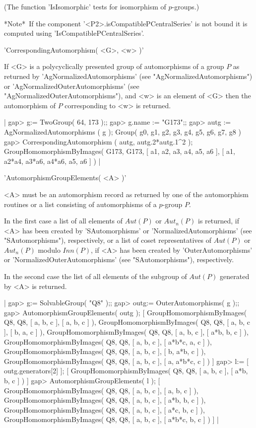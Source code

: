 (The function 'IsIsomorphic' tests for isomorphism of $p$-groups.)

*Note*\:\ If the component '<P2>.isCompatiblePCentralSeries' is not bound
it is computed using 'IsCompatiblePCentralSeries'.


'CorrespondingAutomorphism( <G>, <w> )'

If <G> is a polycyclically presented group of automorphisms of a group $P$
as returned by 'AgNormalizedAutomorphisms' (see
"AgNormalizedAutomorphisms") or
'AgNormalizedOuterAutomorphisms' (see "AgNormalizedOuterAutomorphisms"),
and <w> is an element of <G> then the automorphism of $P$ corresponding to
<w> is returned.

|    gap> g:= TwoGroup( 64, 173 );;
    gap> g.name := "G173";;
    gap> autg := AgNormalizedAutomorphisms ( g );
    Group( g0, g1, g2, g3, g4, g5, g6, g7, g8 )
    gap> CorrespondingAutomorphism ( autg, autg.2*autg.1^2 );
    GroupHomomorphismByImages( G173, G173, [ a1, a2, a3, a4, a5, a6 ],
    [ a1, a2*a4, a3*a6, a4*a6, a5, a6 ] ) |


'AutomorphismGroupElements( <A> )'

<A> must be an automorphism record as returned by one of the automorphism
routines or a list consisting of automorphisms of a $p$-group $P$.

In the first case a list of all elements of $Aut(P)$ or $Aut_n(P)$ is
returned, if <A> has been created by 'SAutomorphisms'
or 'NormalizedAutomorphisms' (see "SAutomorphisms"),
respectively, or a list of coset representatives of $Aut(P)$ or $Aut_n(P)$
modulo $Inn(P)$, if <A> has been created by 'OuterAutomorphisms'
or 'NormalizedOuterAutomorphisms' (see "SAutomorphisms"), respectively.

In the second case the list of all elements of the subgroup of $Aut(P)$
generated by <A> is returned.

|    gap> g:= SolvableGroup( "Q8" );;
    gap> outg:= OuterAutomorphisms( g );;
    gap> AutomorphismGroupElements( outg );
    [ GroupHomomorphismByImages( Q8, Q8, [ a, b, c ], [ a, b, c ] ),
      GroupHomomorphismByImages( Q8, Q8, [ a, b, c ], [ b, a, c ] ),
      GroupHomomorphismByImages( Q8, Q8, [ a, b, c ], [ a*b, b, c ] ),
      GroupHomomorphismByImages( Q8, Q8, [ a, b, c ], [ a*b*c, a, c ] ),
      GroupHomomorphismByImages( Q8, Q8, [ a, b, c ], [ b, a*b, c ] ),
      GroupHomomorphismByImages( Q8, Q8, [ a, b, c ], [ a, a*b*c, c ] ) ]
    gap> l:= [ outg.generators[2] ];
    [ GroupHomomorphismByImages( Q8, Q8, [ a, b, c ], [ a*b, b, c ] ) ]
    gap> AutomorphismGroupElements( l );
    [ GroupHomomorphismByImages( Q8, Q8, [ a, b, c ], [ a, b, c ] ),
      GroupHomomorphismByImages( Q8, Q8, [ a, b, c ], [ a*b, b, c ] ),
      GroupHomomorphismByImages( Q8, Q8, [ a, b, c ], [ a*c, b, c ] ),
      GroupHomomorphismByImages( Q8, Q8, [ a, b, c ], [ a*b*c, b, c ] ) ] |

